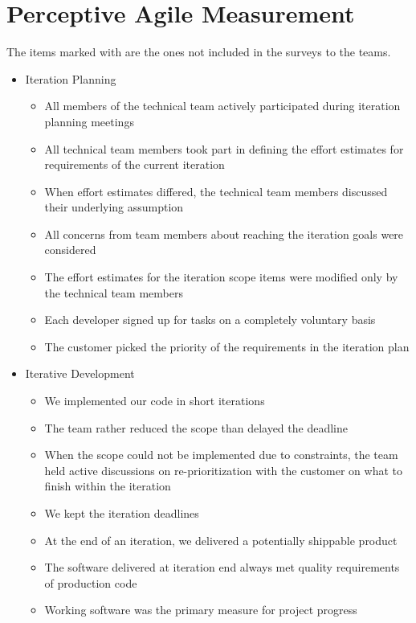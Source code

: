 \chapter{Perceptive Agile Measurement}  %
\label{ch:pam}

The items marked with \XSolidBrush  are the ones not included in the surveys to the teams.

\begin{itemize}
	\item Iteration Planning
		\begin{itemize}
			\item All members of the technical team actively participated during iteration planning meetings
			\item All technical team members took part in defining the effort estimates for requirements of the current iteration
   			\item When effort estimates differed, the technical team members discussed their underlying assumption
   			\item All concerns from team members about reaching the iteration goals were considered
   			\item The effort estimates for the iteration scope items were modified only by the technical team members
   			\item Each developer signed up for tasks on a completely voluntary basis
   			\item The customer picked the priority of the requirements in the iteration plan
		\end{itemize}
	\item Iterative Development
		\begin{itemize}
			\item We implemented our code in short iterations
			\item The team rather reduced the scope than delayed the deadline
			\item When the scope could not be implemented due to constraints, the team held active discussions on re-prioritization with the customer on what to finish within the iteration
			\item We kept the iteration deadlines
			\item At the end of an iteration, we delivered a potentially shippable product
			\item The software delivered at iteration end always met quality requirements of production code
			\item Working software was the primary measure for project progress

\end{itemize}
\end{itemize}
